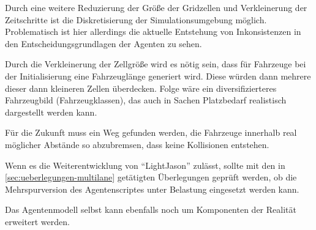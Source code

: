 Durch eine weitere Reduzierung der Größe der Gridzellen und Verkleinerung der Zeitschritte ist die Diskretisierung der Simulationsumgebung möglich.
Problematisch ist hier allerdings die aktuelle Entstehung von Inkonsistenzen in den Entscheidungsgrundlagen der Agenten zu sehen.

Durch die Verkleinerung der Zellgröße wird es nötig sein, dass für Fahrzeuge bei der Initialisierung eine Fahrzeuglänge generiert wird.
Diese würden dann mehrere dieser dann kleineren Zellen überdecken.
Folge wäre ein diversifizierteres Fahrzeugbild (Fahrzeugklassen), das auch in Sachen Platzbedarf realistisch dargestellt werden kann.

Für die Zukunft muss ein Weg gefunden werden, die Fahrzeuge innerhalb real möglicher Abstände so abzubremsen, dass keine Kollisionen entstehen. 

Wenn es die Weiterentwicklung von \enquote{LightJason} zulässt, sollte mit den in \cref{sec:ueberlegungen-multilane} getätigten Überlegungen geprüft werden, ob die Mehrspurversion des Agentenscriptes unter Belastung eingesetzt werden kann.

Das Agentenmodell selbst kann ebenfalls noch um Komponenten der Realität erweitert werden.

